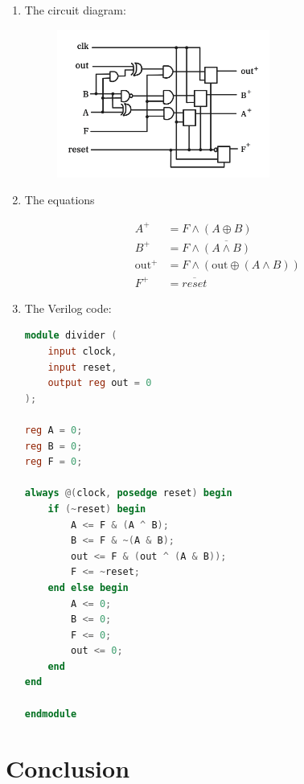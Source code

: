 \documentclass{article}
\begin{document}
    \begin{enumerate}
        \item {
            The circuit diagram:

            \begin{figure}[h]
                \includegraphics[width=7cm]{diagram.png}
            \end{figure}
        }
        \item {
            The equations
        
            \begin{displaymath}
                \begin{aligned}
                    A^+ &= F \land (A \oplus B) \\
                    B^+ &= F \land \overline{(A \land B)} \\
                    \text{out}^+ &= F \land (\text{out} \oplus (A \land B)) \\
                    F^+ &= \overline{reset}
                \end{aligned}
            \end{displaymath}
        }
        \item {
            The Verilog code:

            \begin{lstlisting}[language=verilog]
module divider (
    input clock,
    input reset,
    output reg out = 0
);

reg A = 0;
reg B = 0;
reg F = 0;

always @(clock, posedge reset) begin
    if (~reset) begin
        A <= F & (A ^ B);
        B <= F & ~(A & B);
        out <= F & (out ^ (A & B));
        F <= ~reset;
    end else begin
        A <= 0;
        B <= 0;
        F <= 0;
        out <= 0;
    end
end

endmodule\end{lstlisting}
        }
    \end{enumerate}

    \section*{Conclusion}
    
\end{document}
